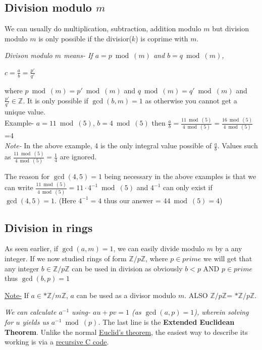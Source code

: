 	 	\subsection{Division modulo $m$}
	 		We can usually do multiplication, subtraction, addition modulo \(m\) but division modulo \(m\) is only possible if the divisior(\(k\)) is coprime with \(m\). \par
	 		\noindent \emph{Divison modulo \(m\) means- If \(a=p\bmod(m)\) and \(b=q \bmod(m)\),} \par
	 		\centering\emph{\(c= \frac{a}{b}= \frac{p'}{q'}\)} \par
	 		\raggedright where \(p \bmod(m) = p' \bmod(m)\) and \(q \bmod(m) = q' \bmod(m)\) and \(\frac{p'}{q'} \in \mathbb{Z}\). It is only possible if \(\gcd(b,m)=1\) as otherwise you cannot get a unique value. \\
	 		Example- \(a= 11 \bmod (5)\), \(b = 4 \bmod (5)\) then \(\frac{a}{b}= \frac{11 \bmod (5)}{4 \bmod (5)}=\frac{16 \bmod (5)}{4 \bmod (5)}\)=4\\
	 		\emph{Note-} In the above example, 4 is the only integral value possible of \(\frac{a}{b}\). Values such as \(\frac{11 \bmod(5)}{4 \bmod(5)}=\frac{1}{4}\) are ignored. \par

	 		The reason for \(\gcd(4, 5)=1\) being necessary in the above examples is that we can write \(\frac{11 \bmod(5)}{4 \bmod(5)}= 11 \cdot 4^{-1} \bmod(5)\) and \(4^{-1}\) can only exist if \(\gcd(4,5)=1\). (Here \(4^{-1}= 4\) thus our answer = \(44 \bmod (5)=4\))

	 	\subsection{Division in rings}
	 		As seen earlier, if \(\gcd(a,m)=1\), we can easily divide modulo \(m\) by a any integer. If we now studied rings of form \(\mathbb{Z}/p\mathbb{Z}\), where \(p \in prime\) we will get that any integer \(b\in \mathbb{Z}/p\mathbb{Z}\) can be used in division as obviously \(b<p\) AND \(p\in prime\) thus \(\gcd(b,p)=1\) \par
	 		
	 		\begin{mybox}\label{theo:extendedEuclid}
	 			\underline{Note-} If \(a\in\ast\mathbb{Z}/m\mathbb{Z}\), \(a\) can be used as a divisor modulo $m$. ALSO \(\mathbb{Z}/p\mathbb{Z}\)= \(\ast \mathbb{Z}/p\mathbb{Z}\). \par
	 			\emph{We can calculate \(a^{-1}\) using- \(au+pv=1\) (as \(\gcd(a,p)=1\)), wherein solving for $u$ yields us \(a^{-1} \bmod(p)\).}
	 			\tcblower
	 			The last line is the \textbf{Extended Euclidean Theorem}. Unlike the normal \hyperref[def:Euclid]{Euclid's theorem}, the easiest way to describe its working is via a \hyperref[add:codeForRecursive]{recursive C code}.
	 		\end{mybox}

